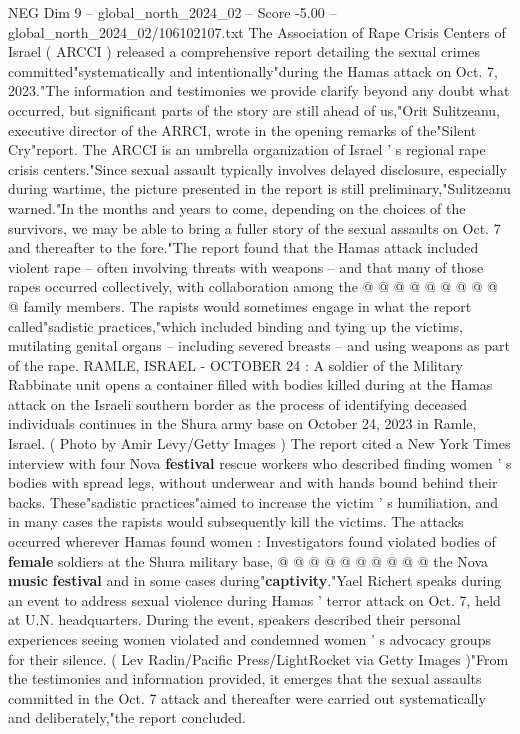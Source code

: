 \begin{textsample}{NEG Dim 9 – global\_north\_2024\_02 – Score -5.00 – global\_north\_2024\_02/106102107.txt}  \label{ex:f9_neg_289}
The Association of Rape Crisis Centers of Israel ( ARCCI ) released a comprehensive report detailing the sexual crimes committed"systematically and intentionally"during the Hamas attack on Oct. 7, 2023."The information and testimonies we provide clarify beyond any doubt what occurred, but significant parts of the story are still ahead of us,"Orit Sulitzeanu, executive director of the ARRCI, wrote in the opening remarks of the"Silent Cry"report.
The ARCCI is an umbrella organization of Israel ' s regional rape crisis centers."Since sexual assault typically involves delayed disclosure, especially during wartime, the picture presented in the report is still preliminary,"Sulitzeanu warned."In the months and years to come, depending on the choices of the survivors, we may be able to bring a fuller story of the sexual assaults on Oct. 7 and thereafter to the fore."The report found that the Hamas attack included violent rape -- often involving threats with weapons -- and that many of those rapes occurred collectively, with collaboration among the @ @ @ @ @ @ @ @ @ @ family members.
The rapists would sometimes engage in what the report called"sadistic practices,"which included binding and tying up the victims, mutilating genital organs -- including severed breasts -- and using weapons as part of the rape.
RAMLE, ISRAEL - OCTOBER 24 : A soldier of the Military Rabbinate unit opens a container filled with bodies killed during at the Hamas attack on the Israeli southern border as the process of identifying deceased individuals continues in the Shura army base on October 24, 2023 in Ramle, Israel. ( Photo by Amir Levy/Getty Images ) The report cited a New York Times interview with four Nova \textbf{festival} rescue workers who described finding women ' s bodies with spread legs, without underwear and with hands bound behind their backs.
These"sadistic practices"aimed to increase the victim ' s humiliation, and in many cases the rapists would subsequently kill the victims.
The attacks occurred wherever Hamas found women : Investigators found violated bodies of \textbf{female} soldiers at the Shura military base, @ @ @ @ @ @ @ @ @ @ the Nova \textbf{music} \textbf{festival} and in some cases during"\textbf{captivity}."Yael Richert speaks during an event to address sexual violence during Hamas ' terror attack on Oct. 7, held at U.N. headquarters.
During the event, speakers described their personal experiences seeing women violated and condemned women ' s advocacy groups for their silence. ( Lev Radin/Pacific Press/LightRocket via Getty Images )"From the testimonies and information provided, it emerges that the sexual assaults committed in the Oct. 7 attack and thereafter were carried out systematically and deliberately,"the report concluded.

\end{textsample}

